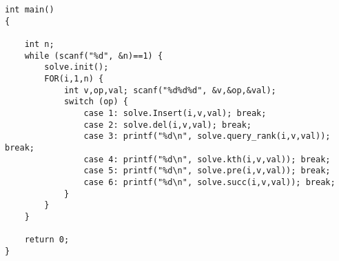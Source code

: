 \begin{lstlisting}
int main()
{

    int n;
    while (scanf("%d", &n)==1) {
        solve.init();
        FOR(i,1,n) {
            int v,op,val; scanf("%d%d%d", &v,&op,&val);
            switch (op) {
                case 1: solve.Insert(i,v,val); break;
                case 2: solve.del(i,v,val); break;
                case 3: printf("%d\n", solve.query_rank(i,v,val)); break;
                case 4: printf("%d\n", solve.kth(i,v,val)); break;
                case 5: printf("%d\n", solve.pre(i,v,val)); break;
                case 6: printf("%d\n", solve.succ(i,v,val)); break;
            }
        }
    }

    return 0;
}
\end{lstlisting}